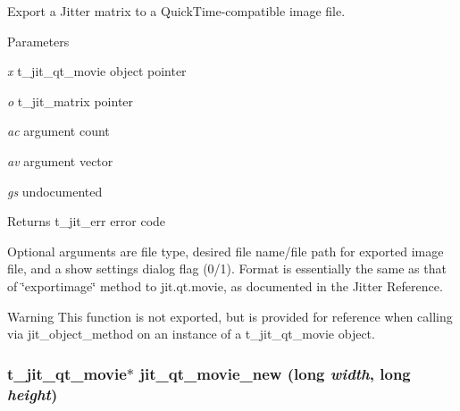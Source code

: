Export a Jitter matrix to a QuickTime-\/compatible image file. 
\begin{DoxyParams}{Parameters}
\item[{\em x}]t\_\-jit\_\-qt\_\-movie object pointer \item[{\em o}]t\_\-jit\_\-matrix pointer \item[{\em ac}]argument count \item[{\em av}]argument vector \item[{\em gs}]undocumented\end{DoxyParams}
\begin{DoxyReturn}{Returns}
t\_\-jit\_\-err error code
\end{DoxyReturn}
Optional arguments are file type, desired file name/file path for exported image file, and a show settings dialog flag (0/1). Format is essentially the same as that of \char`\"{}exportimage\char`\"{} method to jit.qt.movie, as documented in the Jitter Reference.

\begin{DoxyWarning}{Warning}
This function is not exported, but is provided for reference when calling via jit\_\-object\_\-method on an instance of a t\_\-jit\_\-qt\_\-movie object. 
\end{DoxyWarning}
\hypertarget{group__qtmoviemod_gaa771bc8d5b2f69cd74b5d2d69e777063}{
\subsubsection[{jit\_\-qt\_\-movie\_\-new}]{\setlength{\rightskip}{0pt plus 5cm}t\_\-jit\_\-qt\_\-movie$\ast$ jit\_\-qt\_\-movie\_\-new (long {\em width}, \/  long {\em height})}}
\label{group__qtmoviemod_gaa771bc8d5b2f69cd74b5d2d69e777063}


